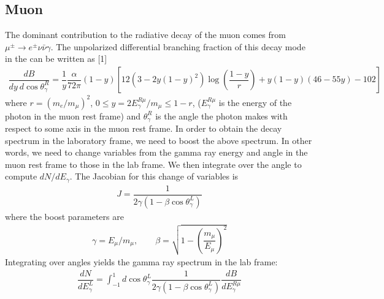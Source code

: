 \documentclass[letterpaper,10pt,english]{sphinxmanual}
\begin{document}
\subsection{Muon}
\label{\detokenize{Description:muon}}
The dominant contribution to the radiative decay of the muon comes from \(\mu^{\pm}\to e^{\pm}\nu\bar{\nu}\gamma\). The unpolarized differential branching fraction of this decay mode in the  can be written as
{[}1{]}
\begin{equation*}
\begin{split}\dfrac{dB}{dy \ d\cos\theta_{\gamma}^{R}} = \dfrac{1}{y}
\dfrac{\alpha}{72\pi}(1-y)\left[
12\left(3 - 2y(1-y)^2\right)\log\left(\dfrac{1-y}{r}\right)
+ y(1-y)(46 - 55y) - 102\right]\end{split}
\end{equation*}
where \(r = (m_{e}/m_{\mu})^2\), \(0 \leq y = 2E_{\gamma}^{R\mu}/m_{\mu} \leq 1 - r\), (\(E_{\gamma}^{R\mu}\) is the energy of the photon in the muon rest frame) and \(\theta_{\gamma}^{R}\) is the angle the photon makes with respect to some axis in the muon rest frame.  In order to obtain the decay spectrum in the laboratory frame, we need to boost the above spectrum. In other words, we need to change variables from the gamma ray energy and angle in the muon rest frame to those in the lab frame. We then integrate over the angle to compute \(dN/dE_{\gamma}\). The Jacobian for this change of variables is
\begin{equation*}
\begin{split}J = \dfrac{1}{2\gamma(1-\beta\cos\theta_{\gamma}^{L})}\end{split}
\end{equation*}
where the boost parameters are
\begin{equation*}
\begin{split}\gamma = E_{\mu} / m_{\mu}, \qquad \beta = \sqrt{1 - \left(\dfrac{m_{\mu}}{E_{\mu}}\right)^2}\end{split}
\end{equation*}
Integrating over angles yields the gamma ray spectrum in the lab frame:
\begin{equation*}
\begin{split}\dfrac{dN}{dE_{\gamma}^{L}} =
\int_{-1}^{1}d\cos\theta_{\gamma}^{L}
\dfrac{1}{2\gamma(1-\beta\cos\theta_{\gamma}^{L})}
\dfrac{dB}{dE_{\gamma}^{R\mu}}\end{split}
\end{equation*}
\end{document}
